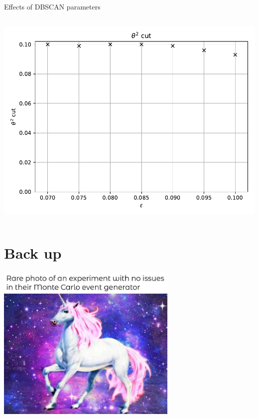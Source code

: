 \begin{frame}{Effects of DBSCAN parameters}
\begin{columns}[onlytextwidth]
\begin{column}{0.33\textwidth}
          \includegraphics[width=\textwidth]{fig/eps_theta_cut.pdf}
      \end{column}
  \end{columns}
\end{frame}

\begin{frame}

\end{frame}


\section{Back up}
\appendix

\begin{frame}[t]{}
  \centering
  \includegraphics[width=0.65\textwidth]{fig/unicorn.jpg}
\end{frame}

